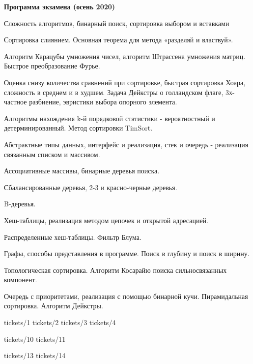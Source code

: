 \documentclass[specialist, subf, href, colorlinks=true, 12pt, times, mtpro, final]{disser}
\begin{document}
\tableofcontents

\newpage
{\Large \bf Программа экзамена (осень 2020)}

\begin{enumerate}
{\footnotesize
\item Сложность алгоритмов, бинарный поиск, сортировка выбором и вставками
\item Сортировка слиянием. Основная теорема для метода «разделяй и властвуй».
\item Алгоритм Карацубы умножения чисел, алгоритм Штрассена умножения матриц. Быстрое преобразование Фурье.
\item Оценка снизу количества сравнений при сортировке, быстрая сортировка Хоара, сложность в среднем и в худшем. Задача Дейкстры о голландском флаге, 3х-частное разбиение, эвристики выбора опорного элемента.
\item Алгоритмы нахождения k-й порядковой статистики - вероятностный и детерминированный. Метод сортировки TimSort.
\item Абстрактные типы данных, интерфейс и реализация, стек и очередь - реализация связанным списком и массивом.
\item Ассоциативные массивы, бинарные деревья поиска.
\item Сбалансированные деревья, 2-3 и красно-черные деревья.
\item B-деревья.
\item Хеш-таблицы, реализация методом цепочек и открытой адресацией.
\item Распределенные хеш-таблицы. Фильтр Блума.
\item Графы, способы представления в программе. Поиск в глубину и поиск в ширину.
\item Топологическая сортировка. Алгоритм Косарайю поиска сильносвязанных компонент.
\item Очередь с приоритетами, реализация с помощью бинарной кучи. Пирамидальная сортировка. Алгоритм Дейкстры.
}
\end{enumerate}

 {tickets/1}
 {tickets/2}
 {tickets/3}
 {tickets/4}

 {tickets/10}
 {tickets/11}

 {tickets/13}
 {tickets/14}
 
\end{document}
